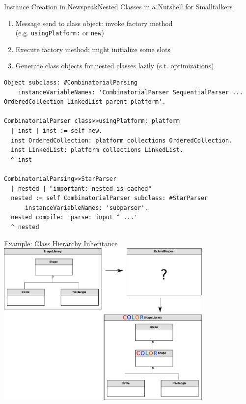 \documentclass[xcolor=dvipsname,handout]{beamer} %
\begin{document}
\begin{frame}[fragile]{Instance Creation in Newspeak}{Nested Classes in a Nutshell for Smalltalkers}
\begin{enumerate}
  \item Message send to class object: invoke factory method \\ (e.g. \texttt{usingPlatform:} or \texttt{new})
  \item Execute factory method: might initialize some slots
  \item Generate class objects for nested classes lazily (s.t. optimizations)
\end{enumerate}

\begin{lstlisting}
Object subclass: #CombinatorialParsing
    instanceVariableNames: 'CombinatorialParser SequentialParser ... OrderedCollection LinkedList parent platform'.

CombinatorialParser class>>usingPlatform: platform
  | inst | inst := self new.
  inst OrderedCollection: platform collections OrderedCollection.
  inst LinkedList: platform collections LinkedList.
  ^ inst

CombinatorialParsing>>StarParser
  | nested | "important: nested is cached"
  nested := self CombinatorialParser subclass: #StarParser 
      instanceVariableNames: 'subparser'.
  nested compile: 'parse: input ^ ...'
  ^ nested
\end{lstlisting}
\end{frame}

\begin{frame}{Example: Class Hierarchy Inheritance}
\centering
\includegraphics[width=0.8\textwidth]{resources/newspeak_inheritance_challenge.pdf}
\end{frame}
\end{document}
